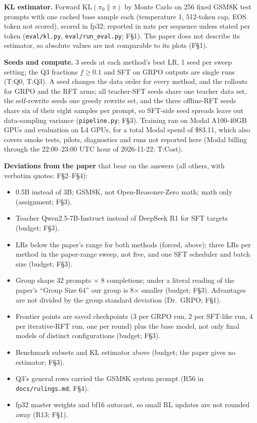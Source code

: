 \documentclass[11pt]{article}
\newcommand{\T}[1]{\textsf{T:#1}}
\newcommand{\F}[1]{\textsf{F\S#1}}
\begin{document}
\textbf{KL estimator.} Forward $\mathrm{KL}(\pi_0\|\pi)$ by Monte Carlo on 256 fixed GSM8K test prompts with one
cached base sample each (temperature 1, 512-token cap, EOS token not scored), scored in fp32; reported
in nats per sequence unless stated per token (\texttt{eval/kl.py}, \texttt{eval/run\_eval.py}; \F{1}). The paper
does not describe its estimator, so absolute values are not comparable to its plots (\F{1}).

\textbf{Seeds and compute.} 3 seeds at each method's best LR, 1 seed per sweep setting; the Q3 fractions
$f \ge 0.1$ and SFT on GRPO outputs are single runs (\T{Q0}, \T{Q3}). A seed changes the data order for every
method, and the rollouts for GRPO and the RFT arms; all teacher-SFT seeds share one teacher data set, the self-rewrite
seeds one greedy rewrite set, and the three offline-RFT seeds share six of their eight samples per prompt, so
SFT-side seed spreads leave out data-sampling variance (\texttt{pipeline.py}; \F{3}). Training ran on Modal A100-40GB GPUs and
evaluation on L4 GPUs, for a total Modal spend of \$83.11, which also covers smoke tests, pilots, diagnostics and runs not
reported here (Modal billing through the 22:00--23:00 UTC hour of 2026-11-22;
\T{Cost}).

\textbf{Deviations from the paper} that bear on the answers (all others, with verbatim quotes: \F{2}--\F{4}):
\begin{itemize}
\item 0.5B instead of 3B; GSM8K, not Open-Reasoner-Zero math; math only (assignment; \F{3}).
\item Teacher Qwen2.5-7B-Instruct instead of DeepSeek R1 for SFT targets (budget; \F{3}).
\item LRs below the paper's range for both methods (forced, above); three LRs per method in the paper-range sweep, not
  five, and one SFT scheduler and batch size (budget; \F{3}).
\item Group shape 32 prompts $\times$ 8 completions; under a literal reading of the paper's ``Group Size 64''
  \cite[Table~2, p.~19]{razor} our group is 8$\times$ smaller (budget; \F{3}). Advantages are not divided by the
  group standard deviation (Dr.~GRPO; \F{1}).
\item Frontier points are saved checkpoints (3 per GRPO run, 2 per SFT-like run, 4 per iterative-RFT run, one per round) plus the base model, not only final
  models of distinct configurations (budget; \F{3}).
\item Benchmark subsets and KL estimator above (budget; the paper gives no estimator; \F{3}).
\item Q3's general rows carried the GSM8K system prompt (R56 in \texttt{docs/rulings.md}; \F{4}).
\item fp32 master weights and bf16 autocast, so small RL updates are not rounded away (R13; \F{1}).
\end{itemize}
\end{document}
